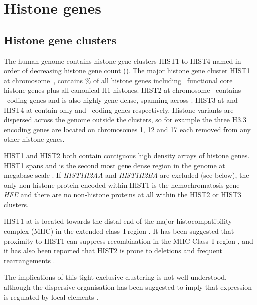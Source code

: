 \section{Histone genes}

  \subsection{Histone gene clusters}
    The human genome contains histone gene clusters HIST1 to HIST4 
	named in order of decreasing histone gene count ().
	The major histone gene cluster HIST1 at chromosome~\HISTOneLocus{}, 
	contains \% of all histone genes 
	including \CodingGenesInHISTOne{}~functional core histone genes plus all canonical H1 histones. 
	HIST2 at chromosome~\HISTTwoLocus{} contains \CodingGenesInHISTTwo{}~coding genes 
	and is also highly gene dense, spanning \HISTTwoSpan{} across \HISTTwoLocus{}. 
	HIST3 at \HISTThreeLocus{} and HIST4 at \HISTTFourLocus{} 
	contain only \CodingGenesInHISTThree{} and \CodingGenesInHISTFour{}~coding genes respectively. 
	Histone variants are dispersed across the genome outside the clusters, 
	so for example the three H3.3 encoding genes are located on chromosomes 1, 12 and 17 
	each removed from any other histone genes.

	HIST1 and HIST2 both contain contiguous high density arrays of histone genes. 
	HIST1 spans \HISTOneSpan{} 
	and is the second most gene dense region in the genome at megabase scale \citep{MHC-III-analysis}.
	If \textit{HIST1H2AA} and \textit{HIST1H2BA} are excluded (see below), 
	the only non-histone protein encoded within HIST1 is the hemochromatosis gene \textit{HFE} 
	and there are no non-histone proteins at all within the HIST2 or HIST3 clusters. 

	HIST1 at \HISTOneLocus{} is located towards the distal end of the major histocompatibility complex (MHC) 
	in the extended class~I region \citep{MHC-I-transcript, MHC-complete-sequencing-1999}. 
	It has been suggested that proximity to HIST1 can suppress recombination in the MHC Class~I region \citep{MHC-repressed-by-HIST}, 
	and it has also been reported that HIST2 is prone to deletions and frequent rearrangements \citep{HISTTwo-prone-deletion-discovery, HISTTwo-prone-deletion-focus}. 

	The implications of this tight exclusive clustering is not well understood, 
	although the dispersive organisation has been suggested to imply that expression is regulated by local elements \citep{close-regulators}. 

